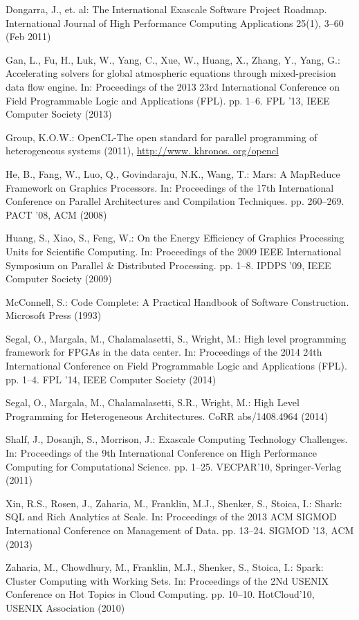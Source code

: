 \documentclass[runningheads,a4paper]{llncs}
\begin{document}
\begin{thebibliography}{22}
Dongarra, J., et. al: {The International Exascale Software Project Roadmap}.
\newblock International Journal of High Performance Computing Applications 25(1), 3--60 (Feb 2011)

Gan, L., Fu, H., Luk, W., Yang, C., Xue, W., Huang, X., Zhang, Y., Yang, G.:
  {Accelerating solvers for global atmospheric equations through
  mixed-precision data flow engine}.
\newblock In: Proceedings of the 2013 23rd International Conference on Field
  Programmable Logic and Applications (FPL). pp. 1--6. FPL '13, IEEE Computer
  Society (2013)

Group, K.O.W.: {OpenCL-The open standard for parallel programming of
  heterogeneous systems} (2011), \urlprefix\url{http://www. khronos.
  org/opencl}

He, B., Fang, W., Luo, Q., Govindaraju, N.K., Wang, T.: {Mars: A MapReduce
  Framework on Graphics Processors}.
\newblock In: Proceedings of the 17th International Conference on Parallel
  Architectures and Compilation Techniques. pp. 260--269. PACT '08, ACM (2008)

Huang, S., Xiao, S., Feng, W.: {On the Energy Efficiency of Graphics Processing
  Units for Scientific Computing}.
\newblock In: Proceedings of the 2009 IEEE International Symposium on Parallel
  \& Distributed Processing. pp. 1--8. IPDPS '09, IEEE Computer Society (2009)

McConnell, S.: {Code Complete: A Practical Handbook of Software Construction}.
\newblock Microsoft Press (1993)

Segal, O., Margala, M., Chalamalasetti, S., Wright, M.: {High level programming
  framework for FPGAs in the data center}.
\newblock In: Proceedings of the 2014 24th International Conference on Field
  Programmable Logic and Applications (FPL). pp. 1--4. FPL '14, IEEE Computer
  Society (2014)

Segal, O., Margala, M., Chalamalasetti, S.R., Wright, M.: {High Level
  Programming for Heterogeneous Architectures}.
\newblock CoRR abs/1408.4964 (2014)

Shalf, J., Dosanjh, S., Morrison, J.: {Exascale Computing Technology
  Challenges}.
\newblock In: Proceedings of the 9th International Conference on High
  Performance Computing for Computational Science. pp. 1--25. VECPAR'10,
  Springer-Verlag (2011)

Xin, R.S., Rosen, J., Zaharia, M., Franklin, M.J., Shenker, S., Stoica, I.: Shark: SQL and Rich Analytics at Scale. In: Proceedings of the 2013 ACM SIGMOD International Conference on Management of Data. pp. 13–24. SIGMOD ’13, ACM (2013)

Zaharia, M., Chowdhury, M., Franklin, M.J., Shenker, S., Stoica, I.: {Spark:
  Cluster Computing with Working Sets}.
\newblock In: Proceedings of the 2Nd USENIX Conference on Hot Topics in Cloud
  Computing. pp. 10--10. HotCloud'10, USENIX Association (2010)
\end{thebibliography}
\end{document}
